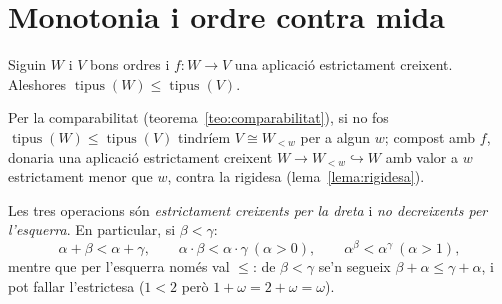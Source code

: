 \section{Monotonia i ordre contra mida}\label{sec:monotonia-ordre-mida}

\begin{lema}\label{lema:immersio-ordre}
Siguin \(W\) i \(V\) bons ordres i \(f\colon W\to V\) una aplicació
estrictament creixent. Aleshores \(\operatorname{tipus}(W)\le\operatorname{tipus}(V)\).
\end{lema}

\begin{prova}
Per la comparabilitat (teorema~\ref{teo:comparabilitat}), si no fos
\(\operatorname{tipus}(W)\le\operatorname{tipus}(V)\) tindríem
\(V\cong W_{<w}\) per a algun \(w\); compost amb \(f\), donaria una
aplicació estrictament creixent \(W\to W_{<w}\hookrightarrow W\) amb valor a
\(w\) estrictament menor que \(w\), contra la rigidesa
(lema~\ref{lema:rigidesa}).
\end{prova}

\begin{proposicio}[Monotonia]\label{prop:monotonia-ordinal}
Les tres operacions són \emph{estrictament creixents per la dreta} i
\emph{no decreixents per l'esquerra}. En particular, si \(\beta<\gamma\):
\[
\alpha+\beta<\alpha+\gamma,
\qquad
\alpha\cdot\beta<\alpha\cdot\gamma\ (\alpha>0),
\qquad
\alpha^{\beta}<\alpha^{\gamma}\ (\alpha>1),
\]
mentre que per l'esquerra només val \(\le\): de \(\beta<\gamma\) se'n
segueix \(\beta+\alpha\le\gamma+\alpha\), i pot fallar l'estrictesa
(\(1<2\) però \(1+\omega=2+\omega=\omega\)).
\end{proposicio}

